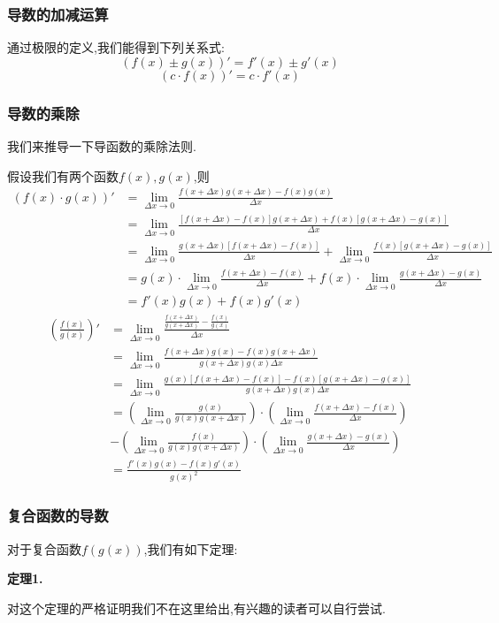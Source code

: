 \documentclass{article}
\begin{document}
\subsubsection{导数的加减运算}
通过极限的定义,我们能得到下列关系式:
\[(f(x)\pm g(x))'=f'(x)\pm g'(x)\]
\[(c\cdot f(x))'=c\cdot f'(x)\]
\subsubsection{导数的乘除}
我们来推导一下导函数的乘除法则.
\par 假设我们有两个函数$f(x),g(x)$,则
\begin{align*}
(f(x)\cdot g(x))'
&=\lim\limits_{\Delta x\to0}\frac{f(x+\Delta x)g(x+\Delta x)-f(x)g(x)}{\Delta x}\\
&=\lim\limits_{\Delta x\to0}\frac{[f(x+\Delta x)-f(x)]g(x+\Delta x)+f(x)[g(x+\Delta x)-g(x)]}{\Delta x}\\
&=\lim\limits_{\Delta x\to0}\frac{g(x+\Delta x)[f(x+\Delta x)-f(x)]}{\Delta x}+\lim\limits_{\Delta x\to0}\frac{f(x)[g(x+\Delta x)-g(x)]}{\Delta x}\\
&=g(x)\cdot\lim\limits_{\Delta x\to0}\frac{f(x+\Delta x)-f(x)}{\Delta x}+f(x)\cdot\lim\limits_{\Delta x\to0}\frac{g(x+\Delta x)-g(x)}{\Delta x}\\
&=f'(x)g(x)+f(x)g'(x)
\end{align*}
\begin{align*}
\left(\frac{f(x)}{g(x)}\right)'
&=\lim\limits_{\Delta x\to0}\frac{\frac{f(x+\Delta x)}{g(x+\Delta x)}-\frac{f(x)}{g(x)}}{\Delta x}\\
&=\lim\limits_{\Delta x\to0}\frac{f(x+\Delta x)g(x)-f(x)g(x+\Delta x)}{g(x+\Delta x)g(x)\Delta x}\\
&=\lim\limits_{\Delta x\to0}\frac{g(x)[f(x+\Delta x)-f(x)]-f(x)[g(x+\Delta x)-g(x)]}{g(x+\Delta x)g(x)\Delta x}\\
&=\left(\lim\limits_{\Delta x\to0}\frac{g(x)}{g(x)g(x+\Delta x)}\right)\cdot\left(\lim\limits_{\Delta x\to0}\frac{f(x+\Delta x)-f(x)}{\Delta x}\right)\\
&-\left(\lim\limits_{\Delta x\to0}\frac{f(x)}{g(x)g(x+\Delta x)}\right)\cdot\left(\lim\limits_{\Delta x\to0}\frac{g(x+\Delta x)-g(x)}{\Delta x}\right)\\
&=\frac{f'(x)g(x)-f(x)g'(x)}{g(x)^2}
\end{align*}

\subsubsection{复合函数的导数}
对于复合函数$f(g(x))$,我们有如下定理:
\par\textbf{定理1.} 
\par 对这个定理的严格证明我们不在这里给出,有兴趣的读者可以自行尝试.
\end{document}

